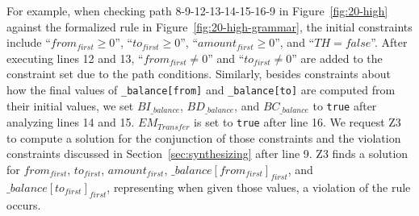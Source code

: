 For example, when checking path 8-9-12-13-14-15-16-9 in Figure~\ref{fig:20-high}
against the formalized rule in Figure~\ref{fig:20-high-grammar},
the initial constraints include ``$from_{first} \geq 0$'', ``$to_{first} \geq 0$'', ``$amount_{first} \geq 0$'', and ``$TH=false$''. 
After executing lines 12 and 13, ``$from_{first} \neq 0$'' and ``$to_{first} \neq 0$''
are added to the constraint set due to the path conditions. 
Similarly, besides constraints about how the final values of \texttt{\_balance[from]} and \texttt{\_balance[to]} are computed from their initial values,
we set $BI_{\_balance}$, $BD_{\_balance}$, and $BC_{\_balance}$ to \texttt{true} after analyzing lines 14 and 15. 
$EM_{Transfer}$ is set to \texttt{true} after line 16. 
We request Z3 to compute a solution for the 
conjunction of those constraints and the violation
constraints discussed in Section~\ref{sec:synthesizing} after 
line 9. 
Z3 finds a solution for $from_{first}$, 
$to_{first}$, $amount_{first}$, $\_balance[from_{first}]_{first}$,
and $\_balance[to_{first}]_{first}$,
representing when given those values, a violation of the rule occurs.  



